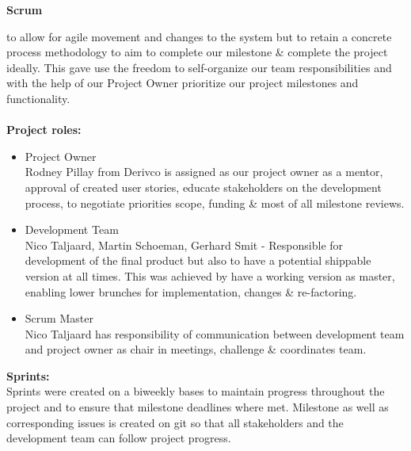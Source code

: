 \documentclass[letterpaper]{article}
\begin{document}
		\begin{huge}
			\textbf{Scrum}
		\end{huge}
		to allow for agile movement and changes to the system but to retain a concrete process methodology to aim to complete our milestone \& complete the project ideally. This gave use the freedom to self-organize our team responsibilities and with the help of our Project Owner prioritize our project milestones and functionality. \\ \\
		\textbf{Project roles:}
		\begin{itemize}
			\item Project Owner \\
					Rodney Pillay from Derivco is assigned as our project owner as a mentor, approval of created user stories, educate stakeholders on the development process, to negotiate priorities scope, funding \& most of all milestone reviews.
			\item Development Team \\
					Nico Taljaard, Martin Schoeman, Gerhard Smit - Responsible for development of the final product but also to have a potential shippable version at all times. This was achieved by have a working version as master, enabling lower brunches for implementation, changes \& re-factoring.
			\item Scrum Master \\
					Nico Taljaard has responsibility of communication between development team and project owner as chair in meetings, challenge \& coordinates team.  \\
		\end{itemize}
		
		\noindent\textbf{Sprints:} \\
		Sprints were created on a biweekly bases to maintain progress throughout the project and to ensure that milestone deadlines where met. Milestone as well as corresponding issues is created on git so that all stakeholders and the development team can follow project progress. \\
		
\end{document}
